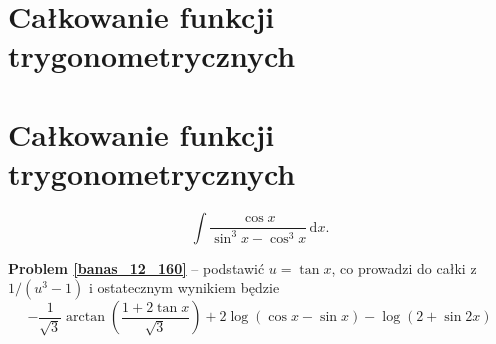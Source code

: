 %

\section{Całkowanie funkcji trygonometrycznych}
\section{Całkowanie funkcji trygonometrycznych}

\begin{problem_with_solution}
    \label{banas_12_160}%
\begin{equation}
    \int \frac{\cos x}{\sin^3 x - \cos^3 x} \, \mathrm{d} x.
\end{equation}
\end{problem_with_solution}

\textbf{Problem \ref{banas_12_160}} -- podstawić $u = \tan x$, co prowadzi do całki z $1/(u^3-1)$ i ostatecznym wynikiem będzie
\begin{equation}
    -\frac {1}{\sqrt{3}} \arctan \left( \frac{1 + 2 \tan x}{\sqrt{3}} \right) 
    + 2 \log (\cos x - \sin x) 
    - \log (2 + \sin 2x)
\end{equation}

%